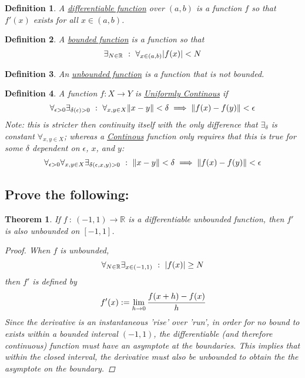 \documentclass[]{article}
\newcommand{\R}{\mathbb{R}}
\newcommand{\st}{\ : \ }
\newtheorem{definition}{Definition}
\newtheorem{theorem}{Theorem}
\begin{document}
\newpage
\section{}

\begin{definition}
    A \emph{\underline{differentiable function}} over $(a,b)$ is a function $f$ so that $f'(x)$ exists for all $x \in (a,b)$.
\end{definition}

\begin{definition}
    A \emph{\underline{bounded function}} is a function so that 
    \[
        \exists_{N \in \R} \st \forall_{x \in (a,b)} \abs{f(x)} < N
    \]
\end{definition}

\begin{definition}
    An \emph{\underline{unbounded function}} is a function that is not bounded.
\end{definition}

\begin{definition}
    A function $f : X \to Y$ is \emph{\underline{Uniformly Continous}} if 
    \[
        \forall_{\epsilon > 0} \exists_{\delta(\epsilon) > 0} \st \forall_{x,y \in X} \norm{x - y} < \delta \implies \norm{f(x) - f(y)} < \epsilon
    \]
    Note: this is stricter then continuity itself with the only difference that $\exists_{\delta}$ is constant $\forall_{x,y \in X}$; whereas a \emph{\underline{Continous}} function only requires that this is true for some $\delta$ dependent on $\epsilon$, $x$, and $y$:
    \[
        \forall_{\epsilon > 0} \forall_{x,y \in X} \exists_{\delta(\epsilon,x,y) > 0} \st \norm{x - y} < \delta \implies \norm{f(x) - f(y)} < \epsilon
    \]
\end{definition}

\subsection{Prove the following:}
\begin{theorem}
    If $f \st (-1,1) \to \R$ is a differentiable unbounded function, then $f'$ is also unbounded on $[-1,1]$.
    \begin{proof}
        When $f$ is unbounded,
        \[
            \forall_{N \in \R} \exists_{x \in (-1,1)} \st \abs{f(x)} \geq N
        \]
        then $f'$ is defined by
        \[
            f'(x) := \lim_{h \to 0} \cfrac{f(x + h) - f(x)}{h}
        \]
        Since the derivative is an instantaneous 'rise' over 'run', in order for no bound to exists within a bounded interval $(-1,1)$, the differentiable (and therefore continuous) function must have an asymptote at the boundaries. This implies that within the closed interval, the derivative must also be unbounded to obtain the the asymptote on the boundary.
    \end{proof}
\end{theorem}
\end{document}
